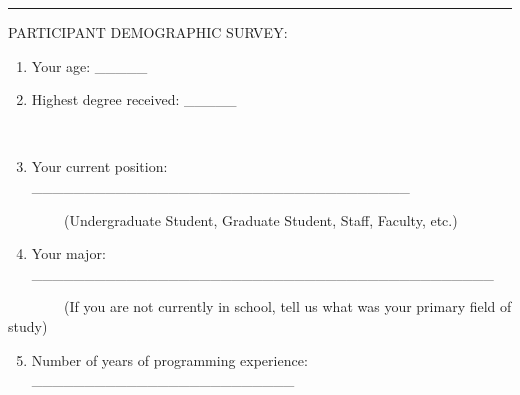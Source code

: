 \documentclass[]{article}
\providecommand{\tightlist}{%
  \setlength{\itemsep}{0pt}\setlength{\parskip}{0pt}}
\begin{document}
{}

{}

{}

{}

{}

{}

{}

{}

{}

{}

\begin{center}\rule{0.5\linewidth}{\linethickness}\end{center}

{}

{PARTICIPANT DEMOGRAPHIC SURVEY:}

{}

\begin{enumerate}
\tightlist
\item
  {Your age: \_\_\_\_\_}
\end{enumerate}

{}

\begin{enumerate}
\setcounter{enumi}{1}
\tightlist
\item
  {Highest degree received: \_\_\_\_\_}
\end{enumerate}

{~~~~~~~~~}

\begin{enumerate}
\setcounter{enumi}{2}
\tightlist
\item
  {Your current position:
  \_\_\_\_\_\_\_\_\_\_\_\_\_\_\_\_\_\_\_\_\_\_\_\_\_\_\_\_\_\_\_\_\_\_\_\_}
\end{enumerate}

{~~~~~~~~}{(Undergraduate Student, Graduate Student, Staff, Faculty,
etc.)}

{}

\begin{enumerate}
\setcounter{enumi}{3}
\tightlist
\item
  {Your major:
  \_\_\_\_\_\_\_\_\_\_\_\_\_\_\_\_\_\_\_\_\_\_\_\_\_\_\_\_\_\_\_\_\_\_\_\_\_\_\_\_\_\_\_\_}
\end{enumerate}

{~~~~~~~~}{(If you are not currently in school, tell us what was your
primary field of study)}

{}

\begin{enumerate}
\setcounter{enumi}{4}
\tightlist
\item
  {Number of years of programming experience:
  \_\_\_\_\_\_\_\_\_\_\_\_\_\_\_\_\_\_\_\_\_\_\_\_\_}
\end{enumerate}
\end{document}
